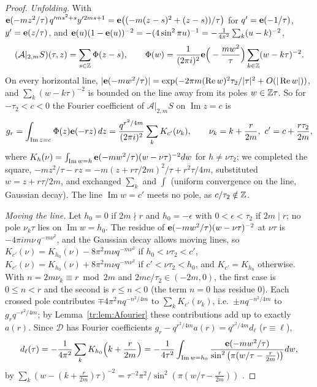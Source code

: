 \begin{proof}
\emph{Unfolding.} With $\mathbf e(-mz^2/\tau)\,q'^{ms^2+s}y'^{2ms+1}=\mathbf e\big((-m(z-s)^2+(z-s))/\tau\big)$ for $q'=\mathbf e(-1/\tau)$, $y'=\mathbf e(z/\tau)$, and $\mathbf e(u)(1-\mathbf e(u))^{-2}=-(4\sin^2\pi u)^{-1}=-\frac1{4\pi^2}\sum_k(u-k)^{-2}$,
\[
(\mathcal A|_{2,m}S)(\tau,z)=\sum_{s\in\mathbb{Z}}\Phi(z-s),\qquad \Phi(w)=\frac1{(2\pi i)^2}\mathbf e\Big(-\frac{mw^2}\tau\Big)\sum_{k\in\mathbb{Z}}(w-k\tau)^{-2}.
\]
On every horizontal line, $|\mathbf e(-mw^2/\tau)|=\exp(-2\pi m(\operatorname{Re}w)^2\tau_2/|\tau|^2+O(|\operatorname{Re}w|))$, and $\sum_k(w-k\tau)^{-2}$ is bounded on the line away from its poles $w\in\mathbb{Z}\tau$. So for $-\tau_2<c<0$ the Fourier coefficient of $\mathcal A|_{2,m}S$ on $\operatorname{Im}z=c$ is
\[
g_r=\int_{\operatorname{Im}z=c}\Phi(z)\e(-rz)\,dz=\frac{q^{r^2/4m}}{(2\pi i)^2}\sum_{k}K_{c'}(\nu_k),\qquad \nu_k=k+\frac r{2m},\ c'=c+\frac{r\tau_2}{2m},
\]
where $K_h(\nu)=\int_{\operatorname{Im}w=h}\mathbf e(-mw^2/\tau)(w-\nu\tau)^{-2}dw$ for $h\ne\nu\tau_2$; we completed the square, $-mz^2/\tau-rz=-m(z+r\tau/2m)^2/\tau+r^2\tau/4m$, substituted $w=z+r\tau/2m$, and exchanged $\sum_k$ and $\int$ (uniform convergence on the line, Gaussian decay). The line $\operatorname{Im}w=c'$ meets no pole, as $c/\tau_2\notin\mathbb{Z}$.

\emph{Moving the line.} Let $h_0=0$ if $2m\nmid r$ and $h_0=-\epsilon$ with $0<\epsilon<\tau_2$ if $2m\mid r$; no pole $\nu_k\tau$ lies on $\operatorname{Im}w=h_0$. The residue of $\mathbf e(-mw^2/\tau)(w-\nu\tau)^{-2}$ at $\nu\tau$ is $-4\pi im\nu\,q^{-m\nu^2}$, and the Gaussian decay allows moving lines, so $K_{c'}(\nu)=K_{h_0}(\nu)-8\pi^2m\nu q^{-m\nu^2}$ if $h_0<\nu\tau_2<c'$, $K_{c'}(\nu)=K_{h_0}(\nu)+8\pi^2m\nu q^{-m\nu^2}$ if $c'<\nu\tau_2<h_0$, and $K_{c'}=K_{h_0}$ otherwise. With $n=2m\nu_k\equiv r\bmod2m$ and $2mc/\tau_2\in(-2m,0)$, the first case is $0\le n<r$ and the second is $r\le n<0$ (the term $n=0$ has residue $0$). Each crossed pole contributes $\mp4\pi^2nq^{-n^2/4m}$ to $\sum_kK_{c'}(\nu_k)$, i.e.\ $\pm nq^{-n^2/4m}$ to $g_rq^{-r^2/4m}$; by Lemma~\ref{tr:lem:Afourier} these contributions add up to exactly $a(r)$. Since $\mathcal D$ has Fourier coefficients $g_r-q^{r^2/4m}a(r)=q^{r^2/4m}d_\ell$ ($r\equiv\ell$),
\[
d_\ell(\tau)=-\frac1{4\pi^2}\sum_kK_{h_0}\Big(k+\frac r{2m}\Big)=-\frac1{4\tau^2}\int_{\operatorname{Im}w=h_0}\frac{\mathbf e(-mw^2/\tau)}{\sin^2\big(\pi(w/\tau-\frac r{2m})\big)}dw,
\]
by $\sum_k(w-(k+\frac r{2m})\tau)^{-2}=\tau^{-2}\pi^2/\sin^2(\pi(w/\tau-\frac r{2m}))$ \cite[Chapter~5, \S2.1]{Ahl79}.


\end{proof}
